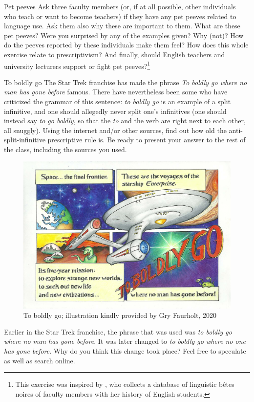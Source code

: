 \begin{exercises}{Pet peeves}
Ask three faculty members (or, if at all possible, other individuals who teach or want to become teachers) if they have any pet peeves related to language use. Ask them also why these are important to them. What are these pet peeves? Were you surprised by any of the examples given? Why (not)? How do the peeves reported by these individuals make them feel? How does this whole exercise relate to prescriptivism? And finally, should English teachers and university lecturers support or fight pet peeves?\footnote{This exercise was inspired by \citet{Baragona2019}, who collects a database of linguistic bêtes noires of faculty members with her history of English students.}

\end{exercises}

\begin{exercises}{To boldly go}\label{exercise-boldly}
The Star Trek franchise has made the phrase \textit{To boldly go where no man has gone before} famous. There have nevertheless been some who have criticized the grammar of this sentence: \textit{to boldly go} is an example of a split infinitive, and one should allegedly never split one's infinitives (one should instead say \textit{to go boldly}, so that the \textit{to} and the verb are right next to each other, all snuggly). Using the internet and/or other sources, find out how old the anti-split-infinitive prescriptive rule is. Be ready to present your answer to the rest of the class, including the sources you used.

\begin{figure}[H]
    \includegraphics[width=.9\textwidth]{chapters/img/boldly.jpg}
    \caption{To boldly go; illustration kindly provided by Gry Faurholt, 2020}
    \label{fig:boldly}
\end{figure}

\noindent Earlier in the Star Trek franchise, the phrase that was used was \textit{to boldly go where no man has gone before}. It was later changed to \textit{to boldly go where no one has gone before}. Why do you think this change took place? Feel free to speculate as well as search online.

\end{exercises}

